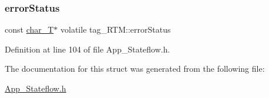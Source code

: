 \subsubsection{\texorpdfstring{error\+Status}{errorStatus}}
{\footnotesize\ttfamily const \mbox{\hyperlink{_app___stateflowtypes_8h_a0fd897430c65dad7d2638a12bc4ea8b5}{char\+\_\+T}}$\ast$ volatile tag\+\_\+\+R\+T\+M\+::error\+Status}



Definition at line 104 of file App\+\_\+\+Stateflow.\+h.



The documentation for this struct was generated from the following file\+:\begin{DoxyCompactItemize}
\item 
\mbox{\hyperlink{_app___stateflow_8h}{App\+\_\+\+Stateflow.\+h}}\end{DoxyCompactItemize}

